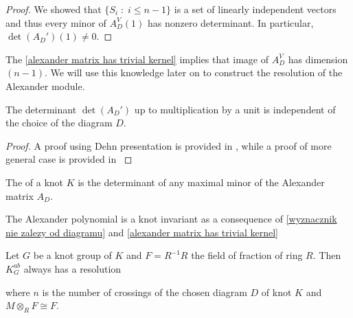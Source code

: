 \begin{proof}
  We showed that $\{S_i\;:\;i\leq n-1\}$ is a set of linearly independent vectors and thus every minor of $A_D^V(1)$ has nonzero determinant. In particular, $\det(A_D')(1)\neq 0$.
\end{proof}

The \cref{alexander matrix has trivial kernel} implies that image of $A_D^V$ has dimension $(n-1)$. We will use this knowledge later on to construct the resolution of the Alexander module.

\begin{theorem}\label{wyznacznik nie zalezy od diagramu}
  The determinant $\det(A_D')$ up to multiplication by a unit is independent of the choice of the diagram $D$.
\end{theorem}

\begin{proof}\color{red}A proof using Dehn presentation is provided in \cite{alex-oryginal}, while a proof of more general case is provided in \cite{fox} 
\end{proof}

\begin{definition}
  The  of a knot $K$ is the determinant of any maximal minor of the Alexander matrix $A_D$.
\end{definition}

The Alexander polynomial is a knot invariant as a consequence of \cref{wyznacznik nie zalezy od diagramu} and \cref{alexander matrix has trivial kernel}

\begin{proposition}
  Let $G$ be a knot group of $K$ and $F=R^{-1}R$ the field of fraction of ring $R$. Then $K_G^{ab}$ always has a resolution
  \begin{center}
  \end{center}
  where $n$ is the number of crossings of the chosen diagram $D$ of knot $K$ and $M\otimes_R F\cong F$.
\end{proposition}

